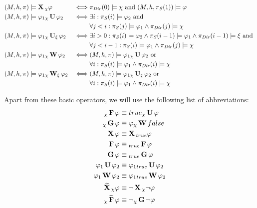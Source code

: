 \begin{alignat*}{2}
	(M,h,\pi) &\models \operatorname{\mathbf{X}}{}_{\chi} \varphi								& \iff & \pi_{\mathit{Dir}}(0) \models \chi \text{ and } (M, h, \pi_{\mathit{S}}(1)) \models \varphi \\
	(M,h,\pi) &\models \varphi_1 {}_{\chi}\operatorname{\mathbf{U}} \varphi_2		  & \iff & \exists i : \pi_{\mathit{S}}(i) \models \varphi_2 \text{ and } \\
				  &																		 & 		 & \forall j < i : \pi_{\mathit{S}}(j) \models \varphi_1 \land \pi_{\mathit{Dir}}(j) \models \chi \\
	(M,h,\pi) &\models \varphi_1 {}_{\chi}\operatorname{\mathbf{U}}_{\xi} \varphi_2 	 & \iff & \exists i > 0 : \pi_{\mathit{S}}(i) \models \varphi_2 \land \pi_{\mathit{S}}(i-1) \models \varphi_1 \land \pi_{\mathit{Dir}}(i-1) \models \xi  \text{ and } \\
				  & 																	  & 	 & \forall j < i - 1 : \pi_{\mathit{S}}(i) \models \varphi_1 \land \pi_{\mathit{Dir}}(j) \models \chi \\
	(M,h,\pi) &\models \varphi_1 {}_{\chi}\operatorname{\mathbf{W}} \varphi_2		  & \iff & (M,h,\pi) \models \varphi_1 {}_{\chi}\operatorname{\mathbf{U}} \varphi_2 \text{ or } \\
				  &																		 & 		 & \forall i : \pi_{\mathit{S}}(i) \models \varphi_1 \land \pi_{\mathit{Dir}}(i) \models \chi \\
	(M,h,\pi) &\models \varphi_1 {}_{\chi}\operatorname{\mathbf{W}}_{\xi} \varphi_2		  & \iff & (M,h,\pi) \models \varphi_1 {}_{\chi}\operatorname{\mathbf{U}}_{\xi} \varphi_2 \text{ or } \\
&																		 & 		 & \forall i : \pi_{\mathit{S}}(i) \models \varphi_1 \land \pi_{\mathit{Dir}}(i) \models \chi \\
\end{alignat*}

Apart from these basic operators, we will use the following list of abbreviations:
\begin{align*}
	{}_{\chi}\operatorname{\mathbf{F}} \varphi 				 & \equiv true {}_{\chi}\operatorname{\mathbf{U}} \varphi \\
	{}_{\chi}\operatorname{\mathbf{G}} \varphi 				& \equiv \varphi {}_{\chi}\operatorname{\mathbf{W}} false \\
	\operatorname{\mathbf{X}} \varphi							& \equiv \operatorname{\mathbf{X}}{}_{true} \varphi \\ 
	\operatorname{\mathbf{F}} \varphi 							& \equiv {}_{true}\operatorname{\mathbf{F}} \varphi \\
	\operatorname{\mathbf{G}} \varphi 							& \equiv {}_{true}\operatorname{\mathbf{G}} \varphi  \\
	\varphi_1 \operatorname{\mathbf{U}} \varphi_2 		 & \equiv \varphi_1 {}_{true}\operatorname{\mathbf{U}} \varphi_2 \\
	\varphi_1 \operatorname{\mathbf{W}} \varphi_2 		& \equiv \varphi_1 {}_{true}\operatorname{\mathbf{W}} \varphi_2 \\
	\operatorname{\mathbf{\widetilde{X}}}{}_{\chi} \varphi			  & \equiv \neg \operatorname{\mathbf{X}}{}_{\chi} \neg \varphi \\
	{}_{\chi}\operatorname{\mathbf{\widetilde{F}}} \varphi 			   & \equiv \neg {}_{\chi}\operatorname{\mathbf{G}} \neg \varphi \\
\end{align*}

